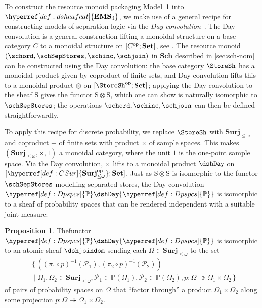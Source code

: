 \documentclass[
  sigconf,
  screen, ]{acmart}
\makeatletter
\theoremstyle{definition}
\newtheorem{proposition}[theorem]{Proposition}
\newcommand\calP{\mathcal P}
\newcommand{\labelword}[2]{\phantomsection
  #1\def\@currentlabel{\unexpanded{#1}}\label{#2}}
\newcommand\nref[2]{\hyperref[#1]{#2}} \newcommand\checkhigh{{\huge{\color{red}\textbf{TODO: check}}}}
\newcommand\funcat[2]{[#1;#2]}
\newcommand\op{^{\rm op}}
\newcommand\Set{\mathbf{Set}}
\newcommand\goodsheafcat{\mathbf{EMS}}
\newcommand\CSur{{\nref{def:CSur}{\mathbf{Surj}_{\le\omega}}}}
\newcommand\CSurop{{\nref{def:CSur}{\mathbf{Surj}_{\le\omega}\op}}}
\newcommand\Store{{\nref{def:store}{\mathrm{S}}}}
\newcommand\Sch{{\nref{def:Sch}{\mathbf{Sch}}}}
\newcommand\discsubscript{_{\rm d}}
\newcommand\Dpspcs{{\nref{def:Dpspcs}{\mathbb{P}}}}
\newcommand\dsheafcat{{\nref{def:dsheafcat}{\goodsheafcat\discsubscript}}}
\makeatother
\begin{document}
To construct the resource monoid packaging Model~1 into $\dsheafcat$,
we make use of a general recipe for constructing models of separation logic
via the \emph{Day convolution}~\cite{o1995syntactic,dongol2016convolution,biering2004logic}.
  The Day convolution is a general construction
  lifting a monoidal structure on a base category $C$
  to a monoidal structure on $\funcat{C\op}\Set$, see \citet{day2006closed}.
  The resource monoid $(\schord,\schSepStores,\schinc,\schjoin)$
  in $\Sch$ described in \cref{sec:sch-nom} can be constructed using the Day convolution:
  the base category $\StoreSh$
  has a monoidal product given by coproduct of finite sets,
  and Day convolution lifts this to a monoidal product $\otimes$
  on $\funcat{\StoreSh\op}\Set$;
  applying the Day convolution to the sheaf $\Store$
  gives the functor $\Store\otimes\Store$, which
  one can show is naturally isomorphic to $\schSepStores$;
  the operations $\schord,\schinc,\schjoin$ can then be defined
  straightforwardly.

To apply this recipe for discrete probability,
we replace $\StoreSh$
with $\CSur$ 
and coproduct $+$ of finite sets
with product $\times$ of sample spaces.
This makes $(\CSur,\times,1)$ a monoidal category,
where the unit $1$ is the one-point sample space.
\labelword{Via}{def:dshDay} the Day convolution, $\times$ lifts to a monoidal product
$\dshDay$ on $\funcat{\CSurop}\Set$.
Just as $\Store\otimes\Store$ is isomorphic to the functor $\schSepStores$ modelling separated stores,
the Day convolution $\Dpspcs\dshDay\Dpspcs$ is isomorphic to
a sheaf of
probability spaces that can be rendered independent with a suitable joint measure:
\begin{proposition}
  \labelword{The}{def:dshjoindom} functor $\Dpspcs\dshDay\Dpspcs$ is isomorphic to
  an atomic sheaf $\dshjoindom$ sending each $\Omega\in\CSur$ to
  the set
  \[ 
     \begin{aligned}
       &\{\,((\pi_1\circ p)^{-1}(\calP_1), (\pi_2\circ p)^{-1}(\calP_2)) \\
       &\!\mid \Omega_1,\Omega_2\in\CSur,\calP_1\in \Dpspcs(\Omega_1), \calP_2\in\Dpspcs(\Omega_2),
         p : \Omega\twoheadrightarrow\Omega_1\times\Omega_2\,\}
     \end{aligned}
  \]
  of pairs of probability spaces on $\Omega$
  that ``factor through'' a product $\Omega_1\times\Omega_2$
  along some projection $p : \Omega\twoheadrightarrow\Omega_1\times\Omega_2$.
\end{proposition}
\end{document}
